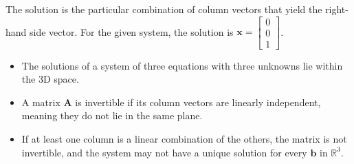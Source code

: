 \begin{center}
\end{center}

The solution is the particular combination of column vectors that yield the right-hand side vector. For the given system, the solution is \(\mathbf{x} = \begin{bmatrix} 0 \\ 0 \\ 1 \end{bmatrix}\).
\begin{itemize}
    \item The solutions of a system of three equations with three unknowns lie within the 3D space. 
    \item A matrix \( \mathbf{A} \) is invertible if its column vectors are linearly independent, meaning they do not lie in the same plane. 
    \item If at least one column is a linear combination of the others, the matrix is not invertible, and the system may not have a unique solution for every \( \mathbf{b} \) in \( \mathbb{R}^3 \).
\end{itemize}



